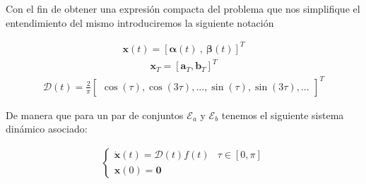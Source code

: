 Con el fin de obtener una expresión compacta del problema que nos simplifique el entendimiento del mismo introduciremos la siguiente notación 


\begin{gather}
    \bm{x}(t) = [\bm{\alpha}(t) \ , \ \bm{\beta}(t)]^T  
\end{gather}
\begin{gather}
    \bm{x}_T = [\bm{a}_T,\bm{b}_T]^T  
\end{gather}
\begin{gather}
    \bm{\mathcal{D}}(t) = \frac{2}{\pi} \begin{bmatrix}
        \cos(\tau) ,
        \cos(3\tau) ,
        ... ,
        \sin(\tau) ,
        \sin(3\tau) ,
        ... 
    \end{bmatrix}^T
\end{gather}

De manera que para un par de conjuntos $\mathcal{E}_a$ y $\mathcal{E}_b$ tenemos el siguiente sistema dinámico asociado:

\begin{gather}
    \begin{cases}
        \dot{\bm{x}}(t) = \bm{\mathcal{D}}(t)f(t) & \tau \in [0,\pi]\\
        \bm{x}(0) = \bm{0}
    \end{cases}
\end{gather}

